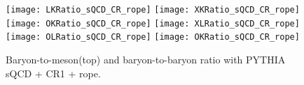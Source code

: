 \begin{figure}[ht]
	\begin{center}
		\texttt{[image: LKRatio\_sQCD\_CR\_rope]}
		\texttt{[image: XKRatio\_sQCD\_CR\_rope]}
		\texttt{[image: OKRatio\_sQCD\_CR\_rope]}
		\texttt{[image: XLRatio\_sQCD\_CR\_rope]}
		\texttt{[image: OLRatio\_sQCD\_CR\_rope]}
		\texttt{[image: OKRatio\_sQCD\_CR\_rope]}
	\end{center}
	\caption{Baryon-to-meson(top) and baryon-to-baryon ratio with PYTHIA sQCD + CR1 + rope.}
	\label{fig:ParticleRatiowithCRandRope}
\end{figure}